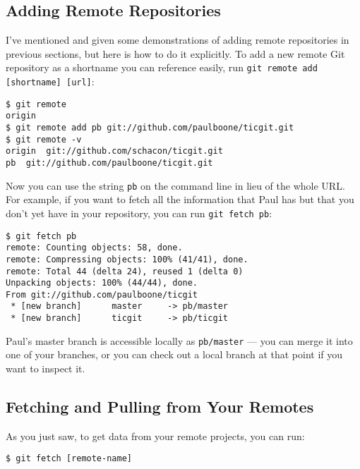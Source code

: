 \documentclass[a4paper]{book}
\begin{document}
\subsection{Adding Remote Repositories}\label{adding-remote-repositories}

I've mentioned and given some demonstrations of adding remote repositories in previous sections, but here is how to do it explicitly. To add a new remote Git repository as a shortname you can reference easily, run \texttt{git remote add {[}shortname{]} {[}url{]}}:

\begin{shaded}\begin{verbatim}
$ git remote
origin
$ git remote add pb git://github.com/paulboone/ticgit.git
$ git remote -v
origin	git://github.com/schacon/ticgit.git
pb	git://github.com/paulboone/ticgit.git
\end{verbatim}\end{shaded}

Now you can use the string \texttt{pb} on the command line in lieu of the whole URL. For example, if you want to fetch all the information that Paul has but that you don't yet have in your repository, you can run \texttt{git fetch pb}:

\begin{shaded}\begin{verbatim}
$ git fetch pb
remote: Counting objects: 58, done.
remote: Compressing objects: 100% (41/41), done.
remote: Total 44 (delta 24), reused 1 (delta 0)
Unpacking objects: 100% (44/44), done.
From git://github.com/paulboone/ticgit
 * [new branch]      master     -> pb/master
 * [new branch]      ticgit     -> pb/ticgit
\end{verbatim}\end{shaded}

Paul's master branch is accessible locally as \texttt{pb/master} --- you can merge it into one of your branches, or you can check out a local branch at that point if you want to inspect it.

\subsection{Fetching and Pulling from Your Remotes}\label{fetching-and-pulling-from-your-remotes}

As you just saw, to get data from your remote projects, you can run:

\begin{shaded}\begin{verbatim}
$ git fetch [remote-name]
\end{verbatim}\end{shaded}
\end{document}
